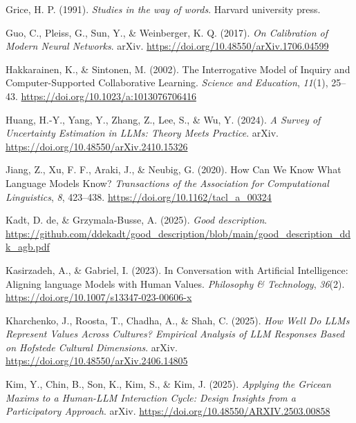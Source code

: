 \documentclass[
  12pt,
]{article}
\newlength{\cslhangindent}
\newenvironment{CSLReferences}[2] %
 {\begin{list}{}{%
  \setlength{\itemindent}{0pt}
  \setlength{\leftmargin}{0pt}
  \setlength{\parsep}{0pt}
  \ifodd #1
   \setlength{\leftmargin}{\cslhangindent}
   \setlength{\itemindent}{-1\cslhangindent}
  \fi
  \setlength{\itemsep}{#2\baselineskip}}}
 {\end{list}}
\begin{document}
\begin{CSLReferences}{1}{0}
Grice, H. P. (1991). \emph{Studies in the way of words}. Harvard university press.

Guo, C., Pleiss, G., Sun, Y., \& Weinberger, K. Q. (2017). \emph{On {Calibration} of {Modern} {Neural} {Networks}}. arXiv. \url{https://doi.org/10.48550/arXiv.1706.04599}

Hakkarainen, K., \& Sintonen, M. (2002). The {Interrogative} {Model} of {Inquiry} and {Computer}-{Supported} {Collaborative} {Learning}. \emph{Science and Education}, \emph{11}(1), 25--43. \url{https://doi.org/10.1023/a:1013076706416}

Huang, H.-Y., Yang, Y., Zhang, Z., Lee, S., \& Wu, Y. (2024). \emph{A {Survey} of {Uncertainty} {Estimation} in {LLMs}: {Theory} {Meets} {Practice}}. arXiv. \url{https://doi.org/10.48550/arXiv.2410.15326}

Jiang, Z., Xu, F. F., Araki, J., \& Neubig, G. (2020). How {Can} {We} {Know} {What} {Language} {Models} {Know}? \emph{Transactions of the Association for Computational Linguistics}, \emph{8}, 423--438. \url{https://doi.org/10.1162/tacl_a_00324}

Kadt, D. de, \& Grzymala-Busse, A. (2025). \emph{Good description}. \url{https://github.com/ddekadt/good_description/blob/main/good_description_ddk_agb.pdf}

Kasirzadeh, A., \& Gabriel, I. (2023). In {Conversation} with {Artificial} {Intelligence}: {Aligning} language {Models} with {Human} {Values}. \emph{Philosophy \& Technology}, \emph{36}(2). \url{https://doi.org/10.1007/s13347-023-00606-x}

Kharchenko, J., Roosta, T., Chadha, A., \& Shah, C. (2025). \emph{How {Well} {Do} {LLMs} {Represent} {Values} {Across} {Cultures}? {Empirical} {Analysis} of {LLM} {Responses} {Based} on {Hofstede} {Cultural} {Dimensions}}. arXiv. \url{https://doi.org/10.48550/arXiv.2406.14805}

Kim, Y., Chin, B., Son, K., Kim, S., \& Kim, J. (2025). \emph{Applying the {Gricean} {Maxims} to a {Human}-{LLM} {Interaction} {Cycle}: {Design} {Insights} from a {Participatory} {Approach}}. arXiv. \url{https://doi.org/10.48550/ARXIV.2503.00858}


\end{CSLReferences}
\end{document}
